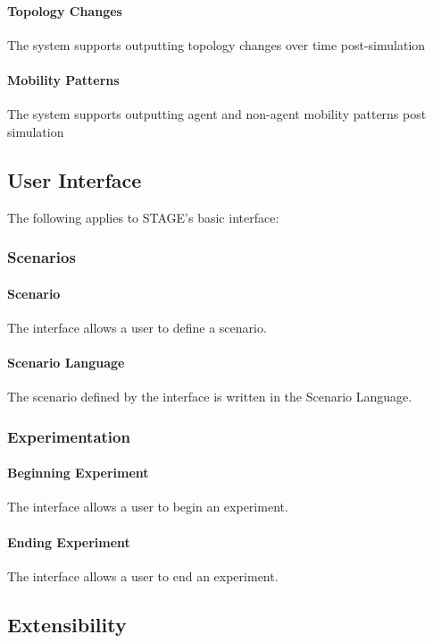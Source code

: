 \documentclass[titlepage]{article}
\begin{document}
	\paragraph{Topology Changes} The system supports outputting topology changes over time post-simulation
	\paragraph{Mobility Patterns} The system supports outputting agent and non-agent mobility patterns post simulation


\subsection{User Interface%
  \label{user-interface}%
}

The following applies to STAGE's basic interface:
\subsubsection{Scenarios}
    \paragraph{Scenario} The interface allows a user to define a scenario.
    \paragraph{Scenario Language} The scenario defined by the interface is written in the Scenario Language.
\subsubsection{Experimentation}
    \paragraph{Beginning Experiment} The interface allows a user to begin an experiment.
    \paragraph{Ending Experiment} The interface allows a user to end an experiment.


\subsection{Extensibility%
  \label{extensibility}%
}
\end{document}

